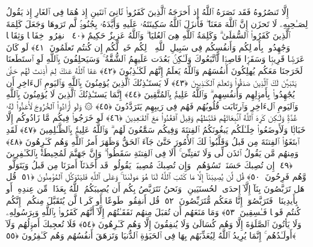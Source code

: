  إِلَّا تَنصُرُوهُ فَقَد نَصَرَهُ ٱللَّهُ إِذ أَخرَجَهُ ٱلَّذِينَ كَفَرُوا۟ ثَانِىَ ٱثنَينِ إِذ هُمَا فِى ٱلغَارِ إِذ يَقُولُ لِصَـٰحِبِهِۦ لَا تَحزَن إِنَّ ٱللَّهَ مَعَنَا ۖ فَأَنزَلَ ٱللَّهُ سَكِينَتَهُۥ عَلَيهِ وَأَيَّدَهُۥ بِجُنُودٍۢ لَّم تَرَوهَا وَجَعَلَ كَلِمَةَ ٱلَّذِينَ كَفَرُوا۟ ٱلسُّفلَىٰ ۗ وَكَلِمَةُ ٱللَّهِ هِىَ ٱلعُليَا ۗ وَٱللَّهُ عَزِيزٌ حَكِيمٌ ﴿٤٠﴾
 ٱنفِرُوا۟ خِفَافًۭا وَثِقَالًۭا وَجَٰهِدُوا۟ بِأَموَٟلِكُم وَأَنفُسِكُم فِى سَبِيلِ ٱللَّهِ ۚ ذَٟلِكُم خَيرٌۭ لَّكُم إِن كُنتُم تَعلَمُونَ ﴿٤١﴾
 لَو كَانَ عَرَضًۭا قَرِيبًۭا وَسَفَرًۭا قَاصِدًۭا لَّٱتَّبَعُوكَ وَلَـٰكِنۢ بَعُدَت عَلَيهِمُ ٱلشُّقَّةُ ۚ وَسَيَحلِفُونَ بِٱللَّهِ لَوِ ٱستَطَعنَا لَخَرَجنَا مَعَكُم يُهلِكُونَ أَنفُسَهُم وَٱللَّهُ يَعلَمُ إِنَّهُم لَكَـٰذِبُونَ ﴿٤٢﴾
 عَفَا ٱللَّهُ عَنكَ لِمَ أَذِنتَ لَهُم حَتَّىٰ يَتَبَيَّنَ لَكَ ٱلَّذِينَ صَدَقُوا۟ وَتَعلَمَ ٱلكَـٰذِبِينَ ﴿٤٣﴾
 لَا يَستَـٔذِنُكَ ٱلَّذِينَ يُؤمِنُونَ بِٱللَّهِ وَٱليَومِ ٱلءَاخِرِ أَن يُجَٰهِدُوا۟ بِأَموَٟلِهِم وَأَنفُسِهِم ۗ وَٱللَّهُ عَلِيمٌۢ بِٱلمُتَّقِينَ ﴿٤٤﴾
 إِنَّمَا يَستَـٔذِنُكَ ٱلَّذِينَ لَا يُؤمِنُونَ بِٱللَّهِ وَٱليَومِ ٱلءَاخِرِ وَٱرتَابَت قُلُوبُهُم فَهُم فِى رَيبِهِم يَتَرَدَّدُونَ ﴿٤٥﴾
 ۞ وَلَو أَرَادُوا۟ ٱلخُرُوجَ لَأَعَدُّوا۟ لَهُۥ عُدَّةًۭ وَلَـٰكِن كَرِهَ ٱللَّهُ ٱنۢبِعَاثَهُم فَثَبَّطَهُم وَقِيلَ ٱقعُدُوا۟ مَعَ ٱلقَـٰعِدِينَ ﴿٤٦﴾
 لَو خَرَجُوا۟ فِيكُم مَّا زَادُوكُم إِلَّا خَبَالًۭا وَلَأَوضَعُوا۟ خِلَـٰلَكُم يَبغُونَكُمُ ٱلفِتنَةَ وَفِيكُم سَمَّٰعُونَ لَهُم ۗ وَٱللَّهُ عَلِيمٌۢ بِٱلظَّـٰلِمِينَ ﴿٤٧﴾
 لَقَدِ ٱبتَغَوُا۟ ٱلفِتنَةَ مِن قَبلُ وَقَلَّبُوا۟ لَكَ ٱلأُمُورَ حَتَّىٰ جَآءَ ٱلحَقُّ وَظَهَرَ أَمرُ ٱللَّهِ وَهُم كَـٰرِهُونَ ﴿٤٨﴾
 وَمِنهُم مَّن يَقُولُ ٱئذَن لِّى وَلَا تَفتِنِّىٓ ۚ أَلَا فِى ٱلفِتنَةِ سَقَطُوا۟ ۗ وَإِنَّ جَهَنَّمَ لَمُحِيطَةٌۢ بِٱلكَـٰفِرِينَ ﴿٤٩﴾
 إِن تُصِبكَ حَسَنَةٌۭ تَسُؤهُم ۖ وَإِن تُصِبكَ مُصِيبَةٌۭ يَقُولُوا۟ قَد أَخَذنَآ أَمرَنَا مِن قَبلُ وَيَتَوَلَّوا۟ وَّهُم فَرِحُونَ ﴿٥٠﴾
 قُل لَّن يُصِيبَنَآ إِلَّا مَا كَتَبَ ٱللَّهُ لَنَا هُوَ مَولَىٰنَا ۚ وَعَلَى ٱللَّهِ فَليَتَوَكَّلِ ٱلمُؤمِنُونَ ﴿٥١﴾
 قُل هَل تَرَبَّصُونَ بِنَآ إِلَّآ إِحدَى ٱلحُسنَيَينِ ۖ وَنَحنُ نَتَرَبَّصُ بِكُم أَن يُصِيبَكُمُ ٱللَّهُ بِعَذَابٍۢ مِّن عِندِهِۦٓ أَو بِأَيدِينَا ۖ فَتَرَبَّصُوٓا۟ إِنَّا مَعَكُم مُّتَرَبِّصُونَ ﴿٥٢﴾
 قُل أَنفِقُوا۟ طَوعًا أَو كَرهًۭا لَّن يُتَقَبَّلَ مِنكُم ۖ إِنَّكُم كُنتُم قَومًۭا فَـٰسِقِينَ ﴿٥٣﴾
 وَمَا مَنَعَهُم أَن تُقبَلَ مِنهُم نَفَقَـٰتُهُم إِلَّآ أَنَّهُم كَفَرُوا۟ بِٱللَّهِ وَبِرَسُولِهِۦ وَلَا يَأتُونَ ٱلصَّلَوٰةَ إِلَّا وَهُم كُسَالَىٰ وَلَا يُنفِقُونَ إِلَّا وَهُم كَـٰرِهُونَ ﴿٥٤﴾
 فَلَا تُعجِبكَ أَموَٟلُهُم وَلَآ أَولَـٰدُهُم ۚ إِنَّمَا يُرِيدُ ٱللَّهُ لِيُعَذِّبَهُم بِهَا فِى ٱلحَيَوٰةِ ٱلدُّنيَا وَتَزهَقَ أَنفُسُهُم وَهُم كَـٰفِرُونَ ﴿٥٥﴾
